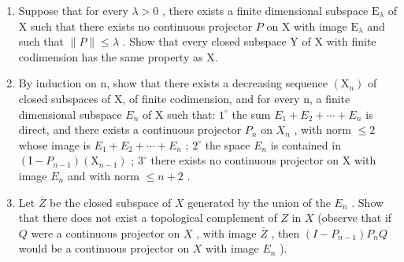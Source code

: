 \begin{enumerate}
\def\labelenumi{\alph{enumi})}
\item
  Suppose that for every \(\lambda > 0\) , there exists a finite dimensional subspace \(\mathrm{E}_{\lambda}\) of X such that there exists no continuous projector \(P\) on X with image \(\mathrm{E}_{\lambda}\) and such that \(\| P \| \leqslant \lambda\) . Show that every closed subspace Y of X with finite codimension has the same property as X.
\item
  By induction on n, show that there exists a decreasing sequence \((\mathrm{X}_{n})\) of closed subspaces of X, of finite codimension, and for every n, a finite dimensional subspace \(E_{n}\) of X such that: \(1^{\circ}\) the sum \(E_{1} + E_{2} + \cdots + E_{n}\) is direct, and there exists a continuous projector \(P_{n}\) on \(X_{n}\) , with norm \(\leqslant 2\) whose image is \(E_{1} + E_{2} + \cdots + E_{n}\) ; \(2^{\circ}\) the space \(E_{n}\) is contained in \((\mathrm{I} - P_{n-1})(\mathrm{X}_{n-1})\) ; \(3^{\circ}\) there exists no continuous projector on X with image \(E_{n}\) and with norm \(\leqslant n + 2\) .
\item
  Let \(\bar{Z}\) be the closed subspace of \(X\) generated by the union of the \(E_{n}\) . Show that there does not exist a topological complement of \(Z\) in \(X\) (observe that if \(Q\) were a continuous projector on \(X\) , with image \(\bar{Z}\) , then \((I - P_{n-1})P_nQ\) would be a continuous projector on \(X\) with image \(E_{n}\) ).
\end{enumerate}
\relax{}
